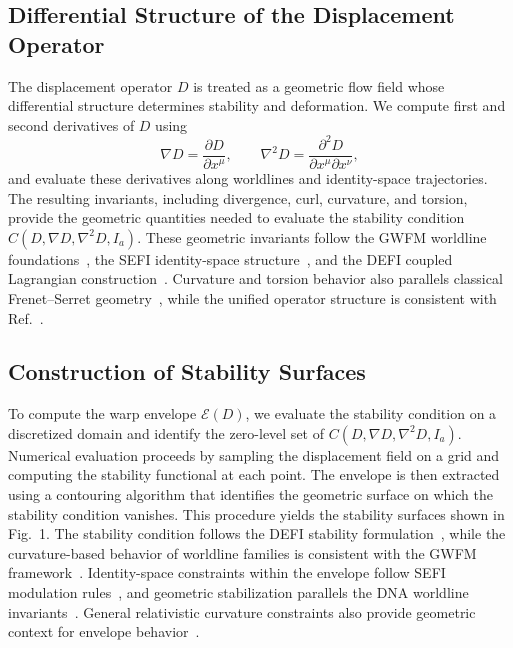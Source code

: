 \documentclass[aip,adv,reprint]{revtex4-2}
\begin{document}
\subsection{Differential Structure of the Displacement Operator}

The displacement operator $D$ is treated as a geometric flow field whose
differential structure determines stability and deformation. We compute first
and second derivatives of $D$ using
\begin{equation}
\nabla D = \frac{\partial D}{\partial x^\mu}, \qquad
\nabla^2 D = \frac{\partial^2 D}{\partial x^\mu \partial x^\nu},
\end{equation}
and evaluate these derivatives along worldlines and identity-space trajectories.
The resulting invariants, including divergence, curl, curvature, and torsion,
provide the geometric quantities needed to evaluate the stability condition
$C(D,\nabla D,\nabla^2 D,I_a)$. These geometric invariants follow the GWFM
worldline foundations~\cite{Dutton_GWFM_JMP_2026}, the SEFI identity-space
structure~\cite{Dutton_SEFI_JMP_2026}, and the DEFI coupled Lagrangian
construction~\cite{Dutton_DEFI_2026}. Curvature and torsion behavior also
parallels classical Frenet--Serret geometry~\cite{Frenet_1851,Serret_1851}, while
the unified operator structure is consistent with Ref.~\cite{Dutton_Unified_JMP_2026}.

\subsection{Construction of Stability Surfaces}

To compute the warp envelope $\mathcal{E}(D)$, we evaluate the stability
condition on a discretized domain and identify the zero-level set of
$C(D,\nabla D,\nabla^2 D,I_a)$. Numerical evaluation proceeds by sampling the
displacement field on a grid and computing the stability functional at each
point. The envelope is then extracted using a contouring algorithm that
identifies the geometric surface on which the stability condition vanishes.
This procedure yields the stability surfaces shown in Fig.~1. The stability
condition follows the DEFI stability formulation~\cite{Dutton_DEFI_2026}, while
the curvature-based behavior of worldline families is consistent with the GWFM
framework~\cite{Dutton_GWFM_JMP_2026}. Identity-space constraints within the
envelope follow SEFI modulation rules~\cite{Dutton_SEFI_JMP_2026}, and geometric
stabilization parallels the DNA worldline invariants~\cite{Dutton_DNA_2026}.
General relativistic curvature constraints also provide geometric context for
envelope behavior~\cite{MTW_Gravitation_1973}.
\end{document}
